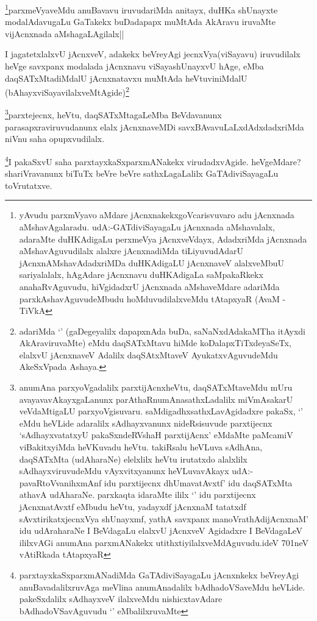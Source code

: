 \begin{artha}
\footnote{yAvudu parxmVyavo aMdare jAcnxnakekxgoVcarisvuvaro adu jAcnxnada aMshavAgalaradu. udA:-GATdiviSayagaLu jAcnxnada aMshavalalx, adaraMte duHKAdigaLu perxmeVya jAcnxveVdayx, AdadxriMda jAcnxnada aMshavAguvudilalx alalxre jAcnxnadiMda tiLiyuvudAdarU jAcnxnAMshavAdadxriMDa duHKAdigaLU jAcnxnaveV alalxveMbuU sariyalalalx, hAgAdare jAcnxnavu duHKAdigaLa saMpakaRkekx anahaRvAguvudu, hiVgidadxrU jAcnxnada aMshaveMdare adariMda parxkAshavAguvudeMbudu hoMduvudilalxveMdu tAtapxyaR (AvaM -TiVkA}parxmeVyaveMdu anuBavavu iruvudariMda anitayx, duHKa shUnayxte modalAdavugaLu GaTakekx buDadapapx muMtAda AkAravu iruvaMte vijAcnxnada aMshagaLAgilalx||
\end{artha}

\begin{artha}
I jagatetxlalxvU jAcnxveV, adakekx beVreyAgi jecnxVya(viSayavu) iruvudilalx heVge savxpanx modalada jAcnxnavu viSayashUnayxvU hAge, eMba daqSATxMtadiMdalU jAcnxnatavxu muMtAda heVtuviniMdalU (bAhayxviSayavilalxveMtAgide)\footnote{adariMda `\stext' (gaDegeyalilx dapapxnAda buDa, saNaNxdAdakaMTha itAyxdi AkAraviruvaMte) eMdu daqSATxMtavu hiMde koDalapxTiTxdeyaSeTx, elalxvU jAcnxnaveV Adalilx daqSAtxMtaveV AyukatxvAguvudeMdu AkeSxVpada Ashaya.}
\end{artha}

\begin{artha}
\footnote{anumAna parxyoVgadalilx parxtijAcnxheVtu, daqSATxMtaveMdu mUru avayavavAkayxgaLanunx parAthaRnumAnasathxLadalilx miVmAsakarU veVdaMtigaLU parxyoVgisuvaru. saMdigadhxsathxLavAgidadxre pakaSx, `\stext' eMdu heVLide adaralilx sAdhayxvanunx nideRsisuvude parxtijecnx `sAdhayxvatatxyU pakaSxndeRVshaH parxtijAcnx' eMdaMte paMcamiV viBakitxyiMda heVKuvadu heVtu. takiRsalu heVLuva sAdhAna, daqSATxMta (udAharaNe) elelxlilx heVtu irutatxdo alalxlilx sAdhayxviruvudeMdu vAyxvitxyanunx heVLuvavAkayx udA:-pavaRtoVvanihxmAnf idu parxtijecnx dhUmavatAvxtf' idu daqSATxMta athavA udAharaNe. parxkaqta idaraMte ililx `\stext' idu parxtijecnx jAcnxnatAvxtf eMbudu heVtu, yadayxdf jAcnxnaM tatatxdf sAvxtirikatxjecnxVya shUnayxmf, yathA savxpanx manoVrathAdijAcnxnaM' idu udAraharaNe I BeVdagaLu elalxvU jAcnxveV Agidadxre I BeVdagaLeV ililxvAGi anumAna parxmANakekx utithxtiyilalxveMdAguvudu.ideV 701neV vAtiRkada tAtapxyaR}parxtejecnx, heVtu, daqSATxMtagaLeMba BeVdavanunx parasapxraviruvudanunx elalx jAcnxnaveMDi savxBAvavuLaLxdAdxdadxriMda niVnu saha opupxvudilalx.
\end{artha}
\begin{artha}
\footnote{parxtayxkaSxparxmANadiMda GaTAdiviSayagaLu jAcnxnkekx beVreyAgi anuBavadalilxruvAga meVlina anumAnadalilx bAdhadoVSaveMdu heVLide. pakeSxdalilx sAdhayxveV ilalxveMdu nishicxtavAdare bAdhadoVSavAguvudu `\stext' eMbalilxruvaMte}I pakaSxvU saha parxtayxkaSxparxmANakekx virudadxvAgide. heVgeMdare? shariVravanunx biTuTx beVre beVre sathxLagaLalilx GaTAdiviSayagaLu toVrutatxve.
\end{artha}

